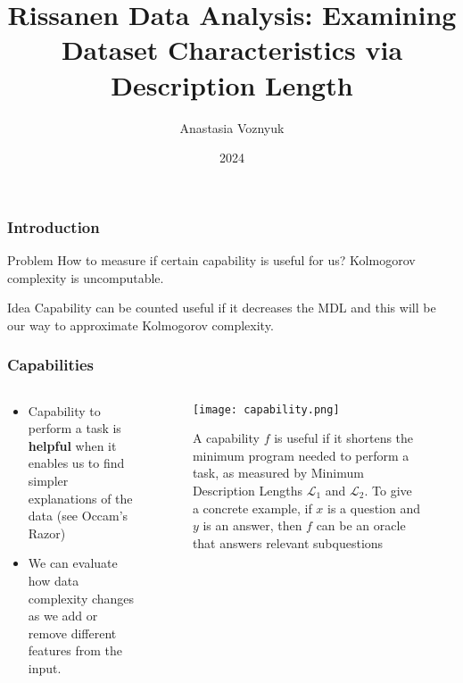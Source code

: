 \documentclass[10pt]{beamer}
\title[Model Complexity]{Rissanen Data Analysis:
Examining Dataset Characteristics via Description Length}
\author[Anastasia Voznyuk]{Anastasia Voznyuk}
\institute{MIPT}
\date{2024}
\begin{document}
\begin{frame}
  \titlepage
\end{frame}

\begin{frame}
	\frametitle{Introduction}
	\begin{block}{Problem}
		How to measure if certain capability is useful for us? Kolmogorov complexity is uncomputable.
	\end{block}
    \begin{block}{Idea}
		Capability can be counted useful if it decreases the MDL and this will be our way to approximate Kolmogorov complexity.
	\end{block}
	
\end{frame}






\begin{frame}
	\frametitle{Capabilities}
    \begin{columns}[onlytextwidth]
        \begin{column}{0.3\textwidth}
            \begin{itemize}
                \item Capability to perform a task is \textbf{helpful} when it enables us to find simpler explanations of the data (see Occam’s Razor)
                \item We can evaluate how data complexity changes as we add or remove different features from the input.
            \end{itemize}
        \end{column}
        \begin{column}{0.6\textwidth}
            \begin{figure}
                \centering
                \texttt{[image: capability.png]} 
                \caption{A capability $f$ is useful if it shortens the minimum program needed to perform a task, as measured by Minimum Description Lengths $\mathcal{L}_1$ and $\mathcal{L}_2$. To give a concrete example, if $x$ is a question and $y$ is an answer, then $f$ can be an oracle that answers relevant subquestions}
            \end{figure}
        \end{column}
    \end{columns}
\end{frame}
\end{document}
